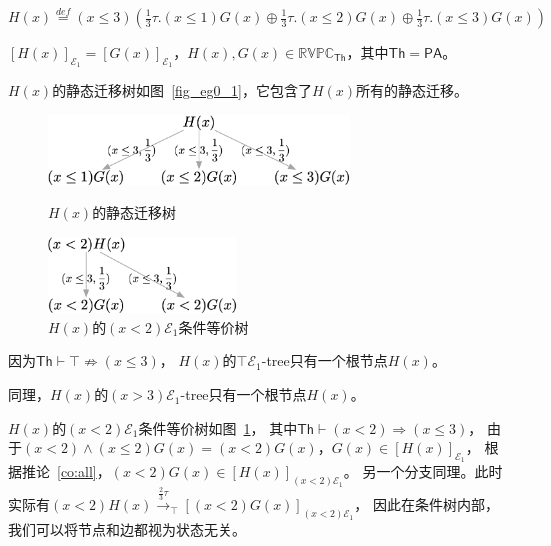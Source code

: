 \begin{example}
   $H(x)\stackrel{def}{=}(x\leq 3)(\frac{1}{3}\tau.(x\leq 1)G(x)\oplus\frac{1}{3}\tau.(x\leq 2)G(x)\oplus\frac{1}{3}\tau.(x\leq 3)G(x))$

   $[H(x)]_{\mathcal{E}_1} = [G(x)]_{\mathcal{E}_1}$，$H(x),G(x)\in \mathbb{RVPC}_{\mathsf{Th}}$，其中$\mathsf{Th}=\mathsf{PA}$\cite{PA}。

   $H(x)$的静态迁移树如图~\ref{fig_eg0_1}，它包含了$H(x)$所有的静态迁移。
   \begin{figure}[!htp]
      \begin{minipage}{0.6\textwidth}
         \centering
         \includegraphics[width=8cm]{../figures/example0_1.png}
         \caption[]{$H(x)$的静态迁移树}
         \label{fig_eg0_1}
   \end{minipage}\hfill
   \begin{minipage}{0.45\textwidth}
      \centering
      \includegraphics[width=5cm]{../figures/example0_2.png}
      \caption[]{$H(x)$的$(x<2)\mathcal{E}_1$条件等价树}
       \label{fig_eg0_2}
   \end{minipage}
    \end{figure}

   因为$\mathsf{Th}\vdash \top \not\Rightarrow (x\leq 3)$，
   $H(x)$的$\top\mathcal{E}_1$-tree只有一个根节点$H(x)$。

   同理，$H(x)$的$(x>3)\mathcal{E}_1$-tree只有一个根节点$H(x)$。

   $H(x)$的$(x<2)\mathcal{E}_1$条件等价树如图~\ref{fig_eg0_2}，
   其中$\mathsf{Th}\vdash (x<2)\Rightarrow (x\leq 3)$，
   由于$(x<2)\wedge(x\leq 2)G(x) = (x<2)G(x)$，$G(x)\in[H(x)]_{\mathcal{E}_1}$，
   根据推论~\ref{co:all}，$(x<2)G(x)\in [H(x)]_{(x<2)\mathcal{E}_1}$。
   另一个分支同理。此时实际有$(x<2)H(x)\stackrel{\frac{2}{3}\tau}{\rightarrow}_{\top}[(x<2)G(x)]_{(x<2)\mathcal{E_1}}$，
   因此在条件树内部，我们可以将节点和边都视为状态无关。

\end{example}
